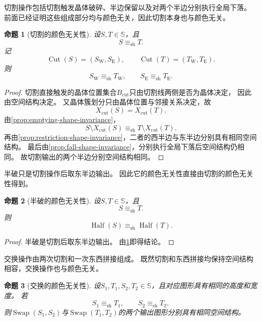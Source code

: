 \documentclass[UTF8,fontset=none]{ctexart}
\theoremstyle{cnthm}
\newtheorem{proposition}{命题}[section]
\begin{document}
			切割操作包括切割触发晶体破碎、半边保留以及对两个半边分别执行全局下落。
			前面已经证明这些组成部分均与颜色无关，因此切割本身也与颜色无关。
			
			\begin{proposition}[切割的颜色无关性]\label{prop:cut-shape-invariance}
				设$S,T\in\mathbb{S}$，且
				$$
				S\equiv_{\mathrm{sh}}T.
				$$
				记
				$$
				\operatorname{Cut}(S)=(S_{\mathrm W},S_{\mathrm E}),
				\qquad
				\operatorname{Cut}(T)=(T_{\mathrm W},T_{\mathrm E}).
				$$
				则
				$$
				S_{\mathrm W}\equiv_{\mathrm{sh}}T_{\mathrm W},
				\qquad
				S_{\mathrm E}\equiv_{\mathrm{sh}}T_{\mathrm E}.
				$$
			\end{proposition}
			
			\begin{proof}
				切割直接触发的晶体位置集合$B_{\mathrm{cut}}$只由切割线两侧是否为晶体决定，
				因此由空间结构决定。
				又晶体簇划分只由晶体位置与邻接关系决定，故
				$$
				X_{\mathrm{cut}}(S)=X_{\mathrm{cut}}(T).
				$$
				由\cref{prop:emptying-shape-invariance}，
				$$
				S\setminus X_{\mathrm{cut}}(S)
				\equiv_{\mathrm{sh}}
				T\setminus X_{\mathrm{cut}}(T).
				$$
				再由\cref{prop:restriction-shape-invariance}，二者的西半边与东半边分别具有相同空间结构。
				最后由\cref{prop:fall-shape-invariance}，分别执行全局下落后空间结构仍相同。
				故切割输出的两个半边分别空间结构相同。
			\end{proof}
			
			半破只是切割操作后取东半边输出。
			因此它的颜色无关性直接由切割的颜色无关性得到。
			
			\begin{proposition}[半破的颜色无关性]\label{prop:half-shape-invariance}
				设$S,T\in\mathbb{S}$，且
				$$
				S\equiv_{\mathrm{sh}}T.
				$$
				则
				$$
				\operatorname{Half}(S)
				\equiv_{\mathrm{sh}}
				\operatorname{Half}(T).
				$$
			\end{proposition}
			
			\begin{proof}
				半破是切割后取东半边输出。
				由\cref{prop:cut-shape-invariance}即得结论。
			\end{proof}
			
			交换操作由两次切割和一次东西拼接组成。
			既然切割和东西拼接均保持空间结构相容，交换操作也与颜色无关。
			
			\begin{proposition}[交换的颜色无关性]\label{prop:swap-shape-invariance}
				设$S_1,T_1,S_2,T_2\in\mathbb{S}$，且对应图形具有相同的高度和宽度。
				若
				$$
				S_1\equiv_{\mathrm{sh}}T_1,
				\qquad
				S_2\equiv_{\mathrm{sh}}T_2,
				$$
				则$\operatorname{Swap}(S_1,S_2)$与$\operatorname{Swap}(T_1,T_2)$的两个输出图形分别具有相同空间结构。
			\end{proposition}
			
\end{document}

